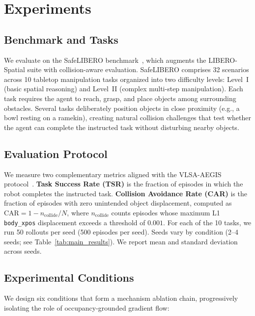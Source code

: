 \section{Experiments}

\subsection{Benchmark and Tasks}

We evaluate on the SafeLIBERO benchmark~\cite{hu2025vlsa}, which augments the LIBERO-Spatial suite with collision-aware evaluation. SafeLIBERO comprises 32 scenarios across 10 tabletop manipulation tasks organized into two difficulty levels: Level~I (basic spatial reasoning) and Level~II (complex multi-step manipulation). Each task requires the agent to reach, grasp, and place objects among surrounding obstacles. Several tasks deliberately position objects in close proximity (e.g., a bowl resting on a ramekin), creating natural collision challenges that test whether the agent can complete the instructed task without disturbing nearby objects.

\subsection{Evaluation Protocol}

We measure two complementary metrics aligned with the VLSA-AEGIS protocol~\cite{hu2025vlsa}. \textbf{Task Success Rate (TSR)} is the fraction of episodes in which the robot completes the instructed task. \textbf{Collision Avoidance Rate (CAR)} is the fraction of episodes with zero unintended object displacement, computed as $\text{CAR} = 1 - n_{\text{collide}} / N$, where $n_{\text{collide}}$ counts episodes whose maximum L1 \texttt{body\_xpos} displacement exceeds a threshold of $0.001$. For each of the 10 tasks, we run 50 rollouts per seed (500 episodes per seed). Seeds vary by condition (2--4 seeds; see Table~\ref{tab:main_results}). We report mean and standard deviation across seeds.

\subsection{Experimental Conditions}

We design six conditions that form a mechanism ablation chain, progressively isolating the role of occupancy-grounded gradient flow:

